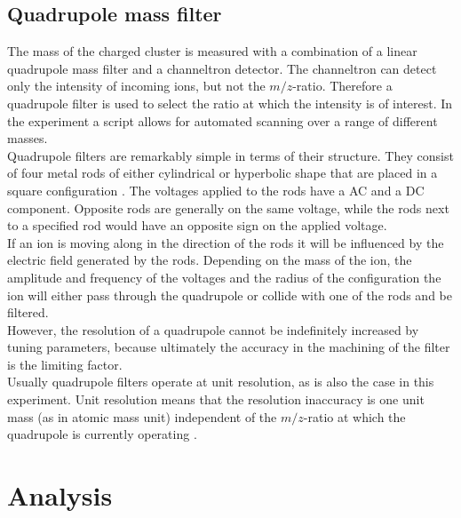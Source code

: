 \documentclass[a4paper,10pt]{article}
\begin{document}
\subsection{Quadrupole mass filter}
The mass of the charged cluster is measured with a combination of a linear quadrupole mass filter and a channeltron detector. The channeltron can detect only the intensity of incoming ions, but not the $m/z$-ratio. Therefore a quadrupole filter is used to select the ratio at which the intensity is of interest. In the experiment a script allows for automated scanning over a range of different masses. \\
Quadrupole filters are remarkably simple in terms of their structure. They consist of four metal rods of either cylindrical or hyperbolic shape that are placed in a square configuration \cite{ms_book}. The voltages applied to the rods have a AC and a DC component. Opposite rods are generally on the same voltage, while the rods next to a specified rod would have an opposite sign on the applied voltage. \\
If an ion is moving along in the direction of the rods it will be influenced by the electric field generated by the rods. Depending on the mass of the ion, the amplitude and frequency of the voltages and the radius of the configuration the ion will either pass through the quadrupole or collide with one of the rods and be filtered. \\
However, the resolution of a quadrupole cannot be indefinitely increased by tuning parameters, because ultimately the accuracy in the machining of the filter is the limiting factor. \\
Usually quadrupole filters operate at unit resolution, as is also the case in this experiment. Unit resolution means that the resolution inaccuracy is one unit mass (as in atomic mass unit) independent of the $m/z$-ratio at which the quadrupole is currently operating \cite{ms_book}.

\section{Analysis}
\end{document}

